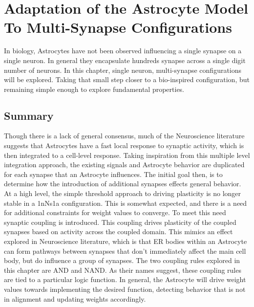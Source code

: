 \chapter{Adaptation of the Astrocyte Model To Multi-Synapse
  Configurations} \label{chapter:obj3}

In biology, Astrocytes have not been observed influencing a single synapse on a
single neuron. In general they encapsulate hundreds synapse across a single
digit number of neurons. In this chapter, single neuron, multi-synapse
configurations will be explored. Taking that small step closer to a bio-inspired
configuration, but remaining simple enough to explore fundamental properties.



  


\section{Summary}
Though there is a lack of general consensus, much of the Neuroscience literature
suggests that Astrocytes have a fast local response to synaptic activity, which
is then integrated to a cell-level response. Taking inspiration from this
multiple level integration approach, the existing signals and Astrocyte behavior
are duplicated for each synapse that an Astrocyte influences. The initial goal
then, is to determine how the introduction of additional synapses effects
general behavior. At a high level, the simple \ca threshold approach to driving
plasticity is no longer stable in a 1nNs1a configuration. This is somewhat
expected, and there is a need for additional constraints for weight values to
converge. To meet this need synaptic coupling is introduced. This coupling
drives plasticity of the coupled synapses based on activity across the coupled
domain. This mimics an effect explored in Neuroscience literature, which is that
ER bodies within an Astrocyte can form pathways between synapses that don't
immediately affect the main cell body, but do influence a group of synapses. The
two coupling rules explored in this chapter are AND and NAND. As their
names suggest, these coupling rules are tied to a particular logic function. In
general, the Astrocyte will drive weight values towards implementing the desired
function, detecting behavior that is not in alignment and updating weights
accordingly.

